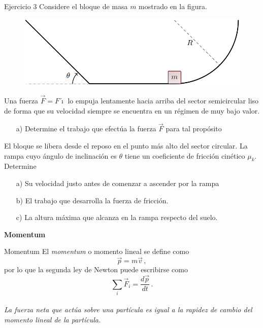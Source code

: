   \begin{frame}{Ejercicio 3}
      Considere el bloque de masa $m$ mostrado en la figura. 

    \begin{figure}
        \centering
        \includegraphics[width=0.5\linewidth]{figures/rampa-curva.png}
    \end{figure}

    Una fuerza $\vec{F}=F\hat{\imath}$ lo empuja lentamente hacia arriba del sector semicircular liso de forma que su velocidad siempre se encuentra en un régimen de muy bajo valor.
      
      \begin{itemize}
          \item[a)] Determine el trabajo que efectúa la fuerza $\vec{F}$ para tal propósito
      \end{itemize}
      El bloque se libera desde el reposo en el punto más alto del sector circular. La rampa cuyo ángulo de inclinación es $\theta$ tiene un coeficiente de fricción cinético $\mu_k$. Determine \begin{itemize}
          \item[a)] Su velocidad justo antes de comenzar a ascender por la rampa
          \item[b)] El trabajo que desarrolla la fuerza de fricción.
          \item[c)] La altura máxima que alcanza en la rampa respecto del suelo.
      \end{itemize}
  \end{frame} 

  \begin{frame}
    \begin{center}
        \Huge \textbf{Momentum}
    \end{center}
\end{frame}

  \begin{frame}{Momentum}
      El \textit{momentum} o momento lineal se define como \begin{equation*}
          \vec{p}=m\vec{v}\,,
      \end{equation*} por lo que la segunda ley de Newton puede escribirse como \begin{equation*}
          \sum_i\vec{F}_i=\frac{d\vec{p}}{dt}\,.
      \end{equation*} \\\textit{La fuerza neta que actúa sobre una partícula es igual a la rapidez de cambio del momento lineal de la partícula.}
  \end{frame}

